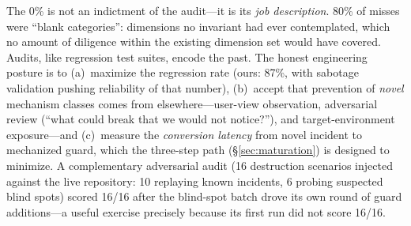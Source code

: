 The 0\% is not an indictment of the audit---it is its \emph{job
description}. 80\% of misses were ``blank categories'': dimensions no
invariant had ever contemplated, which no amount of diligence within the
existing dimension set would have covered. Audits, like regression test
suites, encode the past. The honest engineering posture is to
(a)~maximize the regression rate (ours: 87\%, with sabotage validation
pushing reliability of that number), (b)~accept that prevention of
\emph{novel} mechanism classes comes from elsewhere---user-view
observation, adversarial review (``what could break that we would not
notice?''), and target-environment exposure---and (c)~measure the
\emph{conversion latency} from novel incident to mechanized guard, which
the three-step path (\S\ref{sec:maturation}) is designed to minimize. A
complementary adversarial audit (16 destruction scenarios injected
against the live repository: 10 replaying known incidents, 6 probing
suspected blind spots) scored 16/16 after the blind-spot batch drove its
own round of guard additions---a useful exercise precisely because its
first run did not score 16/16.
